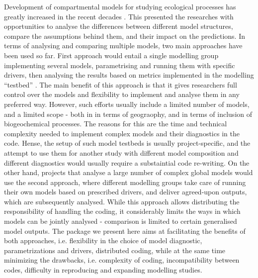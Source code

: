 Development of compartmental models for studying ecological processes has
greatly increased in the recent decades \cite{le_noe_soil_2023,
chandel_microbial_2023, MANZONI20091355}.  This presented the researches with
opportunities to analyse the differences between different model structures,
compare the assumptions behind them, and their impact on the predictions.  In
terms of analysing and comparing multiple models, two main approaches have been
used so far.  First approach would entail a single modelling group implementing
several models, parametrising and running them with specific drivers, then
analysing the results based on metrics implemented in the modelling
``testbed'' \cite{WalkerMultiAssumption2018, SulmanMultiple2018,
LiaoDisentangling2022}. The main benefit of this approach is that it gives
researchers full control over the models and flexibility to implement and
analyse them in any preferred way. However, such efforts usually include a
limited number of models, and a limited scope - both in in terms of geograophy,
and in terms of inclusion of biogeochemical processes.  The reasons for this
are the time and technical complexity needed to implement complex models and
their diagnostics in the code. Hense, the setup of such model testbeds is
usually project-specific, and the attempt to use them for another study with
different model composition and different diagnostics would usually require a
substaintial code re-writing.  On the other hand, projects that analyse a large
number of complex global models \cite{sitch_recent_2015, eyring_overview_2016,
collier_international_2018} would use the second approach, where different
modelling groups take care of running their own models based on prescribed
drivers, and deliver agreed-upon outputs, which are subsequently analysed.
While this approach allows distributing the responsibility of handling the
coding, it considerably limits the ways in which models can be jointly analysed
- comparison is limited to certain generalised model outputs.  The package we
present here aims at facilitating the benefits of both approaches, i.e.
flexibility in the choice of model diagnostic, parametrizations and drivers,
distributed coding, while at the same time minimizing the drawbacks, i.e.
complexity of coding, incompatibility between codes, difficulty in reproducing
and expanding modelling studies.

